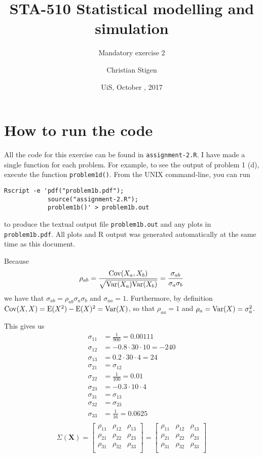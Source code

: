 \documentclass[a4paper,english,12pt]{article}
\title{STA-510 Statistical modelling and simulation}
\subtitle{Mandatory exercise 2}
\author{Christian Stigen}
\date{UiS, October \nth{19}, 2017}
\begin{document}
  \maketitle
\section*{\normalsize{How to run the code}}
All the code for this exercise can be found in \texttt{assignment-2.R}. I have
made a single function for each problem. For example, to see the output of
problem 1 (d), execute the function \texttt{problem1d()}.  From the UNIX
command-line, you can run
\begin{verbatim}
Rscript -e 'pdf("problem1b.pdf");
            source("assignment-2.R");
            problem1b()' > problem1b.out
\end{verbatim}
to produce the textual output file \texttt{problem1b.out} and any plots in
\texttt{problem1b.pdf}. All plots and R output was generated automatically at
the same time as this document.

Because
\begin{align*}
  \rho_{ab} &= \frac{\mathrm{Cov}(X_a, X_b)}{\sqrt{\mathrm{Var}(X_a)\mathrm{Var}(X_b)}} =
    \frac{\sigma_{ab}}{\sigma_a\sigma_b} \\
\end{align*}
we have that $\sigma_{ab} = \rho_{ab}\sigma_a\sigma_b$ and $\sigma_{aa} = 1$.
Furthermore, by definition $\mathrm{Cov}(X,X) = \mathrm{E}(X^2) - \mathrm{E}(X)^2 = \mathrm{Var}(X)$,
so that $\rho_{aa} = 1$ and $\rho_{a} = \mathrm{Var}(X) = \sigma_a^2$.

This gives us
\begin{align*}
  \sigma_{11} &= \frac{1}{900} = 0.00111 \\
  \sigma_{12} &= -0.8 \cdot 30 \cdot 10 = -240 \\
  \sigma_{13} &=  0.2 \cdot 30 \cdot 4 = 24 \\
  \sigma_{21} &= \sigma_{12} \\
  \sigma_{22} &= \frac{1}{100} = 0.01 \\
  \sigma_{23} &= -0.3 \cdot 10 \cdot 4 \\
  \sigma_{31} &= \sigma_{13} \\
  \sigma_{32} &= \sigma_{23} \\
  \sigma_{33} &= \frac{1}{16} = 0.0625 \\
\end{align*}
\[
  \Sigma(\textbf{X}) =
    \begin{bmatrix}
      \rho_{11} & \rho_{12} & \rho_{13} \\
      \rho_{21} & \rho_{22} & \rho_{23} \\
      \rho_{31} & \rho_{32} & \rho_{33} \\
    \end{bmatrix}
  =
    \begin{bmatrix}
      \rho_{11} & \rho_{12} & \rho_{13} \\
      \rho_{21} & \rho_{22} & \rho_{23} \\
      \rho_{31} & \rho_{32} & \rho_{33} \\
    \end{bmatrix}
\]
\end{document}
